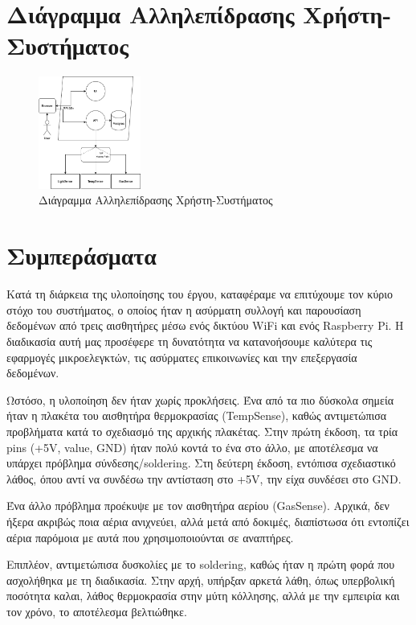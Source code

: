 \documentclass[conference]{IEEEtran}
\begin{document}
\section{Διάγραμμα Αλληλεπίδρασης Χρήστη-Συστήματος}
\begin{figure}[H]
	\centerline{\includegraphics[width=0.3\textwidth]{assets/diagram}}
	\caption{Διάγραμμα Αλληλεπίδρασης Χρήστη-Συστήματος}
	\label{Διάγραμμα Αλληλεπίδρασης Χρήστη-Συστήματος}
\end{figure}

\section{Συμπεράσματα}

Κατά τη διάρκεια της υλοποίησης του έργου, καταφέραμε να επιτύχουμε τον κύριο στόχο του συστήματος, ο οποίος ήταν η ασύρματη συλλογή και παρουσίαση δεδομένων από τρεις αισθητήρες μέσω ενός δικτύου WiFi και ενός Raspberry Pi. Η διαδικασία αυτή μας προσέφερε τη δυνατότητα να κατανοήσουμε καλύτερα τις εφαρμογές μικροελεγκτών, τις ασύρματες επικοινωνίες και την επεξεργασία δεδομένων.

Ωστόσο, η υλοποίηση δεν ήταν χωρίς προκλήσεις. Ένα από τα πιο δύσκολα σημεία ήταν η πλακέτα του αισθητήρα θερμοκρασίας (TempSense), καθώς αντιμετώπισα προβλήματα κατά το σχεδιασμό της αρχικής πλακέτας. Στην πρώτη έκδοση, τα τρία pins (+5V, value, GND) ήταν πολύ κοντά το ένα στο άλλο, με αποτέλεσμα να υπάρχει πρόβλημα σύνδεσης/soldering. Στη δεύτερη έκδοση, εντόπισα σχεδιαστικό λάθος, όπου αντί να συνδέσω την αντίσταση στο +5V, την είχα συνδέσει στο GND.

Ένα άλλο πρόβλημα προέκυψε με τον αισθητήρα αερίου (GasSense). Αρχικά, δεν ήξερα ακριβώς ποια αέρια ανιχνεύει, αλλά μετά από δοκιμές, διαπίστωσα ότι εντοπίζει αέρια παρόμοια με αυτά που χρησιμοποιούνται σε αναπτήρες.

Επιπλέον, αντιμετώπισα δυσκολίες με το soldering, καθώς ήταν η πρώτη φορά που ασχολήθηκα με τη διαδικασία. Στην αρχή, υπήρξαν αρκετά λάθη, όπως υπερβολική ποσότητα καλαι, λάθος θερμοκρασία στην μύτη κόλλησης, αλλά με την εμπειρία και τον χρόνο, το αποτέλεσμα βελτιώθηκε.
\end{document}
